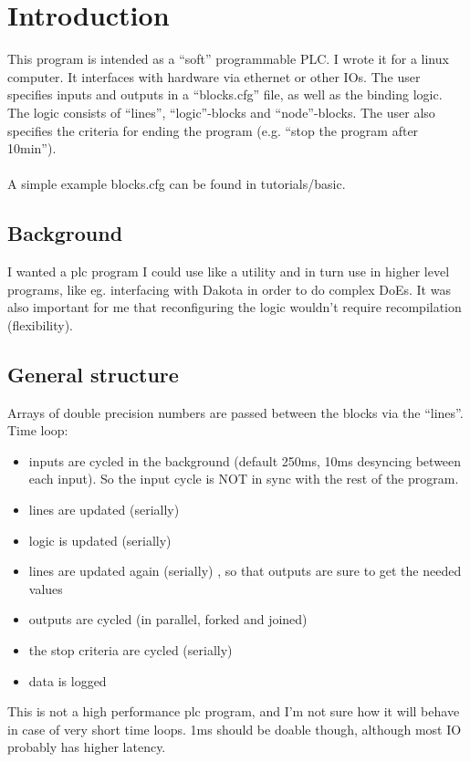 \documentclass[a4paper]{article}
\begin{document}
\section{Introduction}
This program is intended as a ``soft'' programmable PLC. I wrote it for a linux computer. It interfaces with hardware via ethernet or other IOs. The user specifies inputs and outputs in a ``blocks.cfg'' file, as well as the binding logic. The logic consists of ``lines'', ``logic''-blocks and ``node''-blocks. The user also specifies the criteria for ending the program (e.g. ``stop the program after 10min'').\\\\
A simple example blocks.cfg can be found in tutorials/basic.
\subsection{Background}
I wanted a plc program I could use like a utility and in turn use in higher level programs, like eg. interfacing with Dakota in order to do complex DoEs. It was also important for me that reconfiguring the logic wouldn't require recompilation (flexibility). 
\subsection{General structure}
Arrays of double precision numbers are passed between the blocks via the ``lines''.
Time loop:
\begin{itemize}
  \item inputs are cycled in the background (default 250ms, 10ms desyncing between each input). So the input cycle is NOT in sync with the rest of the program.
  \item lines are updated (serially)
  \item logic is updated (serially) 
  \item lines are updated again (serially) , so that outputs are sure to get the needed values 
  \item outputs are cycled (in parallel, forked and joined)
  \item the stop criteria are cycled (serially)
  \item data is logged
\end{itemize}
This is not a high performance plc program, and I'm not sure how it will behave in case of very short time loops. 1ms should be doable though, although most IO probably has higher latency.
\end{document}
